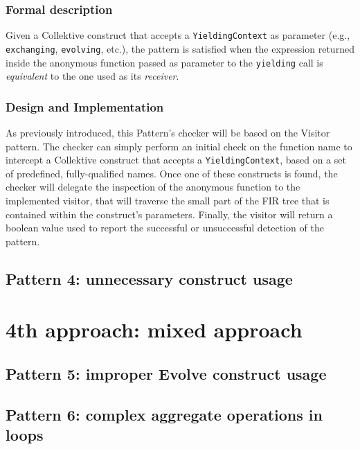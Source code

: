 \documentclass[12pt,a4paper,openright,twoside]{book}
\begin{document}
\subsubsection{Formal description}

Given a Collektive construct that accepts a \lstinline{YieldingContext} as
parameter (e.g., \lstinline{exchanging}, \lstinline{evolving}, etc.), the
pattern is satisfied when the expression returned inside the anonymous function
passed as parameter to the \lstinline{yielding} call is \emph{equivalent} to the
one used as its \emph{receiver}. 

\subsubsection{Design and Implementation}

As previously introduced, this Pattern's checker will be based on the Visitor
pattern. The checker can simply perform an initial check on the function name to
intercept a Collektive construct that accepts a \lstinline{YieldingContext},
based on a set of predefined, fully-qualified names. 
%
Once one of these constructs is found, the checker will delegate the inspection
of the anonymous function to the implemented visitor, that will traverse the
small part of the \ac{FIR} tree that is contained within the construct's
parameters.
%
Finally, the visitor will return a boolean value used to report the successful
or unsuccessful detection of the pattern.

\subsection{Pattern 4: unnecessary construct usage}

\section{4th approach: mixed approach}

\subsection{Pattern 5: improper Evolve construct usage}

\subsection{Pattern 6: complex aggregate operations in loops} \label{sec:p6}

\end{document}
